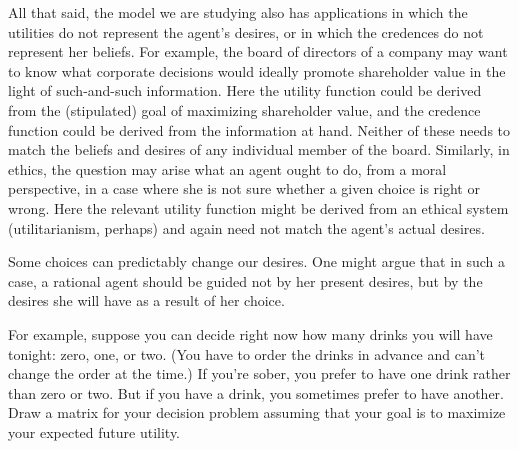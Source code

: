 



All that said, the model we are studying also has applications in
which the utilities do not represent the agent's desires, or in which
the credences do not represent her beliefs. For example, the board of
directors of a company may want to know what corporate decisions would
ideally promote shareholder value in the light of such-and-such
information. Here the utility function could be derived from the
(stipulated) goal of maximizing shareholder value, and the credence
function could be derived from the information at hand. Neither of
these needs to match the beliefs and desires of any individual member
of the board. Similarly, in ethics, the question may arise what an
agent ought to do, from a moral perspective, in a case where she is
not sure whether a given choice is right or wrong. Here the relevant
utility function might be derived from an ethical system
(utilitarianism, perhaps) and again need not match the agent's actual
desires.

\begin{exercise}{3}
  Some choices can predictably change our desires. One might argue that in such
  a case, a rational agent should be guided not by her present desires, but by
  the desires she will have as a result of her choice.

  For example, suppose you can decide right now how many drinks you will have
  tonight: zero, one, or two. (You have to order the drinks in advance and can't
  change the order at the time.) If you're sober, you prefer to have one drink
  rather than zero or two. But if you have a drink, you sometimes prefer to have
  another. Draw a matrix for your decision problem assuming that your goal is to
  maximize your expected future utility.
\end{exercise}

